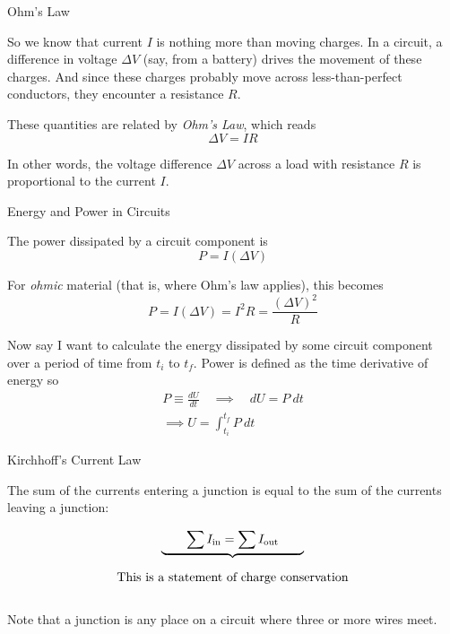 \documentclass{beamer}
\begin{document}
\begin{frame}{Ohm's Law}

So we know that current $I$ is nothing more than moving charges. In a circuit, a difference in voltage $\Delta V$ (say, from a battery) drives the movement of these charges. And since these charges probably move across less-than-perfect conductors, they encounter a resistance $R$. 

\vfill

These quantities are related by \emph{Ohm's Law}, which reads
\begin{equation*}
    \Delta V = IR
\end{equation*}

In other words, the voltage difference $\Delta V$ across a load with resistance $R$ is proportional to the current $I$.

\end{frame}

\begin{frame}{Energy and Power in Circuits}

The power dissipated by a circuit component is
\begin{equation*}
    P = I \left( \Delta V \right)
\end{equation*}

For \emph{ohmic} material (that is, where Ohm's law applies), this becomes
\begin{equation*}
    P = I \left( \Delta V \right) = I^2 R = \frac{\left( \Delta V \right)^2}{R}
\end{equation*}

Now say I want to calculate the energy dissipated by some circuit component over a period of time from $t_i$ to $t_f$. Power is defined as the time derivative of energy so 
\begin{gather*}
    P \equiv \frac{dU}{dt} \quad \implies \quad dU = P\ dt \\
    \implies U = \int_{t_i}^{t_f} P\ dt
\end{gather*}

\end{frame}

\begin{frame}{Kirchhoff's Current Law}

The sum of the currents entering a junction is equal to the sum of the currents leaving a junction:

\begin{equation*}
    \underbrace{\hspace{2em}\sum I_{\text{in}} = \sum I_{\text{out}}\hspace{2em}}_{\parbox[c]{0.8\textwidth}{\begin{center} This is a statement of charge conservation \end{center}}}
\end{equation*}

\vfill

Note that a junction is any place on a circuit where three or more wires meet.

\end{frame}
\end{document}
